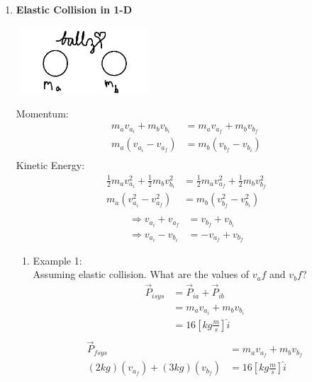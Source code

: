 \documentclass{article}
\begin{document}
\begin{enumerate}
\begin{enumerate}
            \end{enumerate}
            \item \textbf{Elastic Collision in 1-D}
            \begin{center}\includegraphics[width=5cm, height=2.5cm]{4.PNG}\end{center}
            Momentum:
            \begin{align*}
                m_av_{a_i}+m_bv_{b_i}&=m_av_{a_f}+m_bv_{b_f} \\
                m_a(v_{a_i}-v_{a_f})&=m_b(v_{b_f}-v_{b_i}) \\
            \end{align*}
            Kinetic Energy:
            \begin{align*}
                \frac{1}{2}m_av_{a_i}^2 + \frac{1}{2}m_bv_{b_i}^2&=\frac{1}{2}m_av_{a_f}^2 + \frac{1}{2}m_bv_{b_f}^2 \\
                m_a(v_{a_i}^2-v_{a_f}^2)&=m_b(v_{b_f}^2-v_{b_i}^2) \\
            \end{align*}
            \begin{align*}
                \Rightarrow v_{a_i}+v_{a_f}&=v_{b_f}+v_{b_i} \\
                \Rightarrow v_{a_i}-v_{b_i}&=-v_{a_f}+v_{b_f}
            \end{align*}
            \begin{enumerate}
                \item Example 1: \\
                Assuming elastic collision. What are the values of $v_af$ and $v_bf$?
                \begin{align*}
                    \vec{P}_{i sys}&=\vec{P}_{ia}+\vec{P}_{ib} \\
                    &=m_av_{a_i}+m_bv_{b_i} \\
                    &=16[kg\frac{m}{s}]\hat{i} \\
                \end{align*}  
                \begin{align*}
                    \vec{P}_{f sys}&=m_av_{a_f}+m_bv_{b_f} \\
                    (2 kg)(v_{a_f})+(3 kg)(v_{b_f})&=16[kg\frac{m}{s}]\hat{i} \\

\end{align*}
\end{enumerate}
\end{enumerate}
\end{document}
